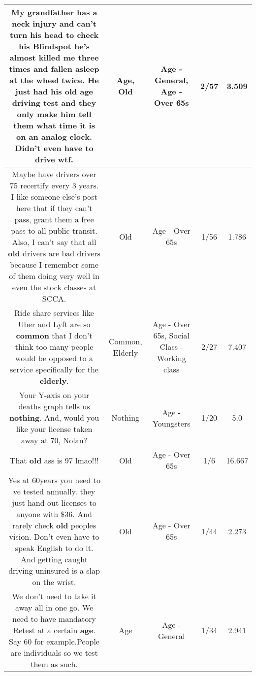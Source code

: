 \documentclass[11pt]{article}
\newlength\mylength
\begin{document}
\begin{center}
\begin{longtable}{|C{.65\mylength}|C{.30\mylength}|C{.12\mylength}|C{.12\mylength}|C{.12\mylength}|}
  \small My grandfather has a neck injury and can't turn his head to check his Blindspot he's almost killed me three times and fallen asleep at the wheel twice. He just had his \textbf{old} \textbf{age} driving test and they only make him tell them what time it is on an analog clock. Didn't even have to drive wtf.\normalsize   & Age, Old & Age - General, Age - Over 65s & 2/57 & 3.509 \\  \hline
  \small Maybe have drivers over 75 recertify every 3 years. I like someone else's post here that if they can't pass, grant them a free pass to all public transit. Also, I can't say that all \textbf{old} drivers are bad drivers because I remember some of them doing very well in even the stock classes at SCCA.\normalsize   & Old & Age - Over 65s & 1/56 & 1.786 \\  \hline
  \small Ride share services like Uber and Lyft are so \textbf{common} that I don't think too many people would be opposed to a service specifically for the \textbf{elderly}.\normalsize   & Common, Elderly & Age - Over 65s, Social Class - Working class & 2/27 & 7.407 \\  \hline
  \small Your Y-axis on your deaths graph tells us \textbf{nothing}. And, would you like your license taken away at 70, Nolan?\normalsize   & Nothing & Age - Youngsters & 1/20 & 5.0 \\  \hline
  \small That \textbf{old} ass is 97 lmao!!!\normalsize   & Old & Age - Over 65s & 1/6 & 16.667 \\  \hline
  \small Yes at 60years you need to ve tested annually. they just hand out licenses to anyone with \$36. And rarely check \textbf{old} peoples vision. Don't even have to speak English to do it. And getting caught driving uninsured is a slap on the wrist.\normalsize   & Old & Age - Over 65s & 1/44 & 2.273 \\  \hline
  \small We don't need to take it away all in one go. We need to have mandatory Retest at a certain \textbf{age}. Say 60 for example.People are individuals so we test them as such.\normalsize   & Age & Age - General & 1/34 & 2.941 \\  \hline

\end{longtable}
\end{center}
\end{document}
